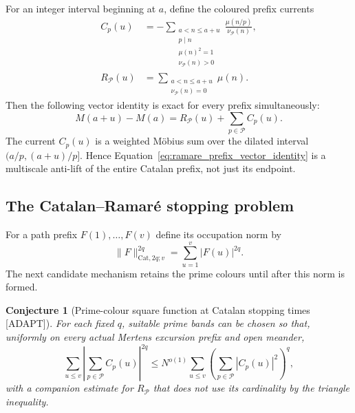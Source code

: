 \documentclass[11pt]{amsart}
\numberwithin{equation}{section}
\theoremstyle{plain}
\newtheorem{conjecture}[theorem]{Conjecture}
\theoremstyle{definition}
\theoremstyle{remark}
\newcommand{\Mob}{\mu}
\newcommand{\Mert}{M}
\begin{document}
For an integer interval beginning at $a$, define the coloured prefix currents
\begin{align}
 C_p(u)&=-\sum_{\substack{a<n\leq a+u\\p\mid n\\\Mob(n)^2=1\\
                         \nu_{\mathcal P}(n)>0}}
 \frac{\Mob(n/p)}{\nu_{\mathcal P}(n)},\\
 R_{\mathcal P}(u)&=\sum_{\substack{a<n\leq a+u\\
                         \nu_{\mathcal P}(n)=0}}\Mob(n).
\end{align}
Then the following vector identity is exact for every prefix simultaneously:
\begin{equation}
 \boxed{
 \Mert(a+u)-\Mert(a)
 =R_{\mathcal P}(u)+\sum_{p\in\mathcal P}C_p(u).}
\label{eq:ramare_prefix_vector_identity}
\end{equation}
The current $C_p(u)$ is a weighted M\"obius sum over the dilated interval
$(a/p,(a+u)/p]$.  Hence Equation~\eqref{eq:ramare_prefix_vector_identity}
is a multiscale anti-lift of the entire Catalan prefix, not just its endpoint.

\subsection{The Catalan--Ramar\'e stopping problem}

For a path prefix $F(1),\ldots,F(v)$ define its occupation norm by
\begin{equation}
 \|F\|_{\mathrm{Cat},2q;v}^{2q}
 =\sum_{u=1}^{v}|F(u)|^{2q}.
\label{eq:catalan_occupation_norm}
\end{equation}
The next candidate mechanism retains the prime colours until after this norm
is formed.

\begin{conjecture}[Prime-colour square function at Catalan stopping times
\textnormal{[ADAPT]}]
\label{conj:ramare_catalan_square_function}
For each fixed $q$, suitable prime bands can be chosen so that, uniformly on
every actual Mertens excursion prefix and open meander,
\begin{equation}
 \sum_{u\leq v}\left|\sum_{p\in\mathcal P}C_p(u)\right|^{2q}
 \leq N^{o(1)}
 \sum_{u\leq v}\left(\sum_{p\in\mathcal P}|C_p(u)|^2\right)^q,
\label{eq:ramare_catalan_square_function}
\end{equation}
with a companion estimate for $R_{\mathcal P}$ that does not use its
cardinality by the triangle inequality.
\end{conjecture}
\end{document}
